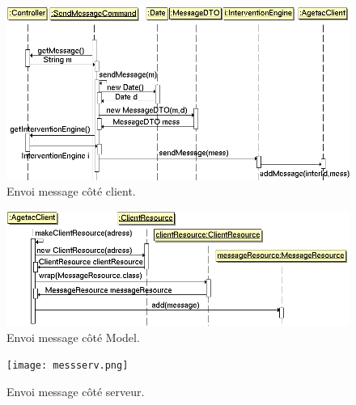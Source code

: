 \documentclass{article}
\begin{document}
\begin{figure}[htbp]
\begin{center}
\includegraphics[width=460pt]{doc_dev-fig012.png}
\caption{Envoi message côté client.}
\end{center}
\end{figure}

\begin{figure}[htbp]
\begin{center}
\includegraphics[width=460pt]{doc_dev-fig013.png}
\caption{Envoi message côté Model.}
\end{center}
\end{figure}

\begin{figure}[htbp]
\begin{center}
\texttt{[image: messserv.png]}
\caption{Envoi message côté serveur.}
\end{center}
\end{figure}
\end{document}
